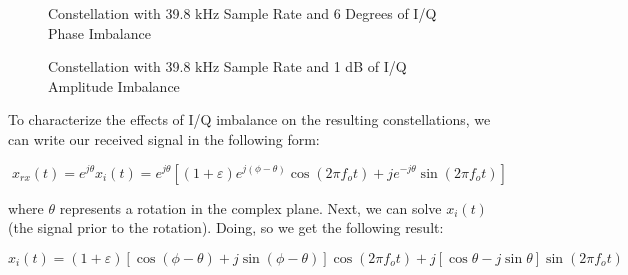 \documentclass{article}
\begin{document}
\begin{figure}[H]
	\centerline{}
	\caption{Constellation with 39.8 kHz Sample Rate and 6 Degrees of I/Q Phase Imbalance}
	\label{fig::iq_imbalance_0_mag_6_phase_39p8k_samp_rate_const}
\end{figure}

\begin{figure}[H]
	\centerline{}
	\caption{Constellation with 39.8 kHz Sample Rate and 1 dB of I/Q Amplitude Imbalance}
	\label{fig::iq_imbalance_1_mag_0_phase_39p8k_samp_rate_const}
\end{figure}

To characterize the effects of I/Q imbalance on the resulting constellations, we can write our received signal in the following form:

\begin{equation}
	x_{rx}(t) = e^{j\theta}x_i(t) = e^{j\theta}\left[(1+\varepsilon)e^{j(\phi-\theta)}\cos(2{\pi}f_ot)+je^{-j\theta}\sin(2{\pi}f_ot)\right]
\end{equation}

where $\theta$ represents a rotation in the complex plane. Next, we can solve $x_i(t)$ (the signal prior to the rotation). Doing, so we get the following result:

\begin{equation}
	x_i(t) = (1+\varepsilon)[\cos(\phi-\theta)+j\sin(\phi-\theta)]\cos(2{\pi}f_ot)+j[\cos\theta-j\sin\theta]\sin(2{\pi}f_ot)
\end{equation}
\end{document}
